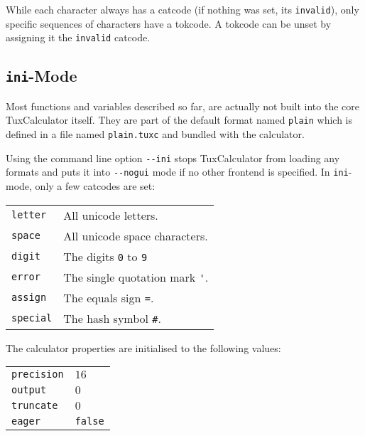 \documentclass[10pt]{article}
\begin{document}
    While each character always has a catcode (if nothing was set, its \verb|invalid|), only specific sequences of characters have a tokcode.
    A tokcode can be unset by assigning it the \verb|invalid| catcode.
    
    \subsection{\texttt{ini}-Mode}\label{subsec:inimode}
    Most functions and variables described so far, are actually not built into the core TuxCalculator itself.
    They are part of the default format named \verb|plain| which is defined in a file named \verb|plain.tuxc| and bundled with the calculator.
    
    Using the command line option \verb|--ini| stops TuxCalculator from loading any formats and puts it into \verb|--nogui| mode if no other frontend is specified.
    In \texttt{ini}-mode, only a few catcodes are set:
    \begin{center}
        \begin{tabular}{p{}p{}}
            \verb|letter|  & All unicode letters.                \\
            \verb|space|   & All unicode space characters.       \\
            \verb|digit|   & The digits \verb|0| to \verb|9|     \\
            \verb|error|   & The single quotation mark \verb|'|. \\
            \verb|assign|  & The equals sign \verb|=|.           \\
            \verb|special| & The hash symbol \verb|#|.           \\
        \end{tabular}
    \end{center}
    
    The calculator properties are initialised to the following values:
    \begin{center}
        \begin{tabular}{p{}p{}}
            \verb|precision| & $ 16 $       \\
            \verb|output|    & $ 0 $        \\
            \verb|truncate|  & $ 0 $        \\
            \verb|eager|     & \verb|false| \\
        \end{tabular}
    \end{center}
    
\end{document}
